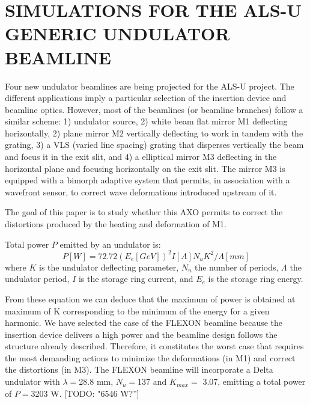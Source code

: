 \documentclass[]{spie}  %
\newcommand{\todo}[1]{{\color{red}[TODO: "#1'']}}
\begin{document}
\section{SIMULATIONS FOR THE ALS-U GENERIC UNDULATOR BEAMLINE}
Four new undulator beamlines are being projected for the ALS-U project. The different applications imply a particular selection of the insertion device and beamline optics. However, most of the beamlines (or beamline branches) follow a similar scheme: 1) undulator source, 2) white beam flat mirror M1 deflecting horizontally, 2) plane mirror M2 vertically deflecting to work in tandem with the grating, 3) a VLS (varied line spacing) grating that disperses vertically the beam and focus it in the exit slit, and 4) a elliptical mirror M3 deflecting in the horizontal plane and focusing horizontally on the exit slit. The mirror M3 is equipped with a bimorph adaptive system that permits, in association with a wavefront sensor, to correct wave deformations introduced upstream of it.

The goal of this paper is to study whether this AXO permits to correct the distortions produced by the heating and deformation of M1.

Total power $P$ emitted by an undulator is: 
\begin{equation}
    P [W] = 72.72  (E_e [GeV])^2  I[A]  N_u  K^2 / \Lambda[mm]
\end{equation}
where $K$ is the undulator deflecting parameter, $N_u$ the number of periods, $\Lambda$ the undulator period, $I$ is the storage ring current, and $E_e$ is the storage ring energy. 

From these equation we can deduce that the maximum of power is obtained at maximum of K corresponding to the minimum of the energy for a given harmonic.  We have selected the case of the FLEXON beamline because the insertion device delivers a high power and the beamline design follows the structure already described. Therefore, it constitutes the worst case that requires the most demanding actions to minimize the deformations (in M1) and correct the distortions (in M3). The FLEXON beamline will incorporate a Delta undulator \cite{deltaundulator} with $\lambda=$28.8 mm, $N_u=$137 and $K_{max}=$ 3.07, emitting a total power of $P=$3203 W. \todo{6546 W?}
\end{document}
